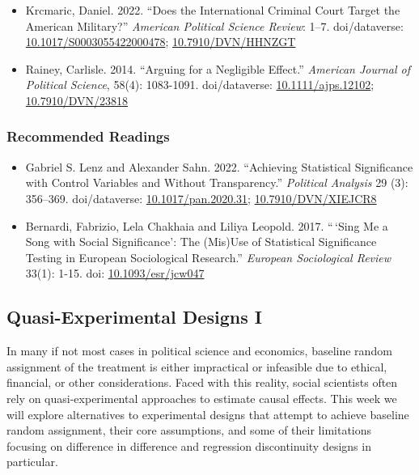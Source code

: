 \documentclass[12pt,]{article}
\begin{document}
\begin{itemize}
\item
  Krcmaric, Daniel. 2022. ``Does the International Criminal Court Target
  the American Military?'' \emph{American Political Science Review}:
  1--7. doi/dataverse:
  \href{https://doi.org/10.1017/S0003055422000478}{10.1017/S0003055422000478};
  \href{https://doi.org/10.7910/DVN/HHNZGT}{10.7910/DVN/HHNZGT}
\item
  Rainey, Carlisle. 2014. ``Arguing for a Negligible Effect.''
  \emph{American Journal of Political Science}, 58(4): 1083-1091.
  doi/dataverse:
  \href{https://doi.org/10.1111/ajps.12102}{10.1111/ajps.12102};
  \href{https://doi.org/10.7910/DVN/23818}{10.7910/DVN/23818}
\end{itemize}

\hypertarget{recommended-readings-8}{%
\subsubsection{Recommended Readings}\label{recommended-readings-8}}

\begin{itemize}
\item
  Gabriel S. Lenz and Alexander Sahn. 2022. ``Achieving Statistical
  Significance with Control Variables and Without Transparency.''
  \emph{Political Analysis} 29 (3): 356--369. doi/dataverse:
  \href{https://doi.org/10.1017/pan.2020.31}{10.1017/pan.2020.31};
  \href{https://doi.org/10.7910/DVN/XIEJCR8}{10.7910/DVN/XIEJCR8}
\item
  Bernardi, Fabrizio, Lela Chakhaia and Liliya Leopold. 2017. ``\,`Sing
  Me a Song with Social Significance': The (Mis)Use of Statistical
  Significance Testing in European Sociological Research.''
  \emph{European Sociological Review} 33(1): 1-15. doi:
  \href{https://doi.org/10.1093/esr/jcw047}{10.1093/esr/jcw047}
\end{itemize}

\hypertarget{quasi-experimental-designs-i}{%
\subsection{Quasi-Experimental Designs
I}\label{quasi-experimental-designs-i}}

\noindent In many if not most cases in political science and economics,
baseline random assignment of the treatment is either impractical or
infeasible due to ethical, financial, or other considerations. Faced
with this reality, social scientists often rely on quasi-experimental
approaches to estimate causal effects. This week we will explore
alternatives to experimental designs that attempt to achieve baseline
random assignment, their core assumptions, and some of their limitations
focusing on difference in difference and regression discontinuity
designs in particular.
\end{document}
